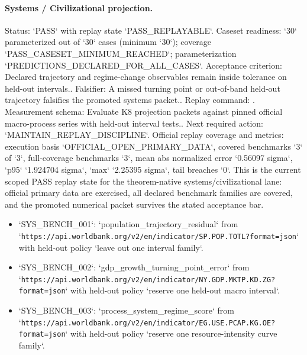 \paragraph{Systems / Civilizational projection.}
Status: `PASS` with replay state `PASS\_REPLAYABLE`.
Caseset readiness: `30` parameterized out of `30` cases (minimum `30`); coverage `PASS\_CASESET\_MINIMUM\_REACHED`; parameterization `PREDICTIONS\_DECLARED\_FOR\_ALL\_CASES`.
Acceptance criterion: Declared trajectory and regime-change observables remain inside tolerance on held-out intervals..
Falsifier: A missed turning point or out-of-band held-out trajectory falsifies the promoted systems packet..
Replay command: .
Measurement schema: Evaluate K8 projection packets against pinned official macro-process series with held-out interval tests..
Next required action: `MAINTAIN\_REPLAY\_DISCIPLINE`.
Official replay coverage and metrics: execution basis `OFFICIAL\_OPEN\_PRIMARY\_DATA`, covered benchmarks `3` of `3`, full-coverage benchmarks `3`, mean abs normalized error `0.56097 sigma`, `p95` `1.924704 sigma`, `max` `2.25395 sigma`, tail breaches `0`.
This is the current scoped PASS replay state for the theorem-native
systems/civilizational lane: official primary data are exercised, all declared
benchmark families are covered, and the promoted numerical packet survives the
stated acceptance bar.
\begin{itemize}
\item `SYS\_BENCH\_001`: `population\_trajectory\_residual` from `\texttt{https://api.worldbank.org/v2/en/indicator/SP.POP.TOTL?format=json}` with held-out policy `leave out one interval family`.
\item `SYS\_BENCH\_002`: `gdp\_growth\_turning\_point\_error` from `\texttt{https://api.worldbank.org/v2/en/indicator/NY.GDP.MKTP.KD.ZG?format=json}` with held-out policy `reserve one held-out macro interval`.
\item `SYS\_BENCH\_003`: `process\_system\_regime\_score` from `\texttt{https://api.worldbank.org/v2/en/indicator/EG.USE.PCAP.KG.OE?format=json}` with held-out policy `reserve one resource-intensity curve family`.
\end{itemize}
